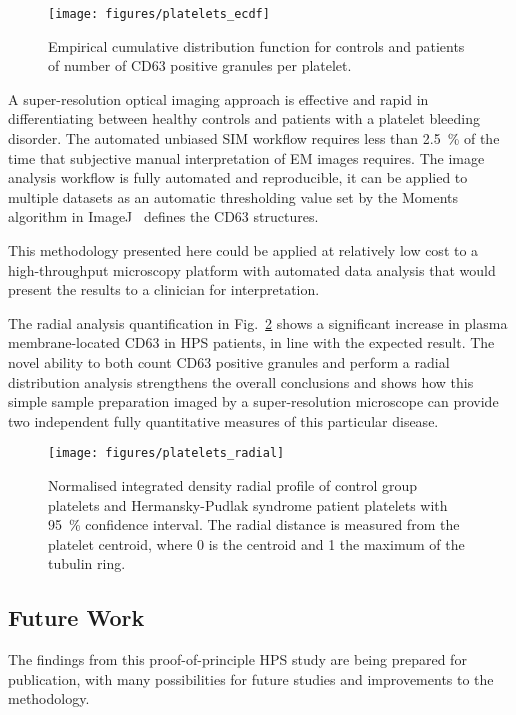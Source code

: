\begin{figure}[htbp]
	\centering
	\texttt{[image: figures/platelets\_ecdf]}
	\caption{\small{Empirical cumulative distribution function for controls and patients of number of CD63 positive granules per platelet.}}
	\label{platelet_ecdf}
\end{figure}

A super-resolution optical imaging approach is effective and rapid in differentiating between healthy controls and patients with a platelet bleeding disorder. The automated unbiased SIM workflow requires less than \SI{2.5}{\percent} of the time that subjective manual interpretation of EM images requires.  The image analysis workflow is fully automated and reproducible, it can be applied to multiple datasets as an automatic thresholding value set by the Moments algorithm in ImageJ~\cite{Schneider2012} defines the CD63 structures.

This methodology presented here could be applied at relatively low cost to a high-throughput microscopy platform with automated data analysis that would present the results to a clinician for interpretation.

The radial analysis quantification in Fig.~\ref{platelets_radial} shows a significant increase in plasma membrane-located CD63 in HPS patients, in line with the expected result. The novel ability to both count CD63 positive granules and perform a radial distribution analysis strengthens the overall conclusions and shows how this simple sample preparation imaged by a super-resolution microscope can provide two independent fully quantitative measures of this particular disease.

\begin{figure}[htbp]
	\centering
	\texttt{[image: figures/platelets\_radial]}
	\caption{\small{Normalised integrated density radial profile of control group platelets and Hermansky-Pudlak syndrome patient platelets with \SI{95}{\percent} confidence interval. The radial distance is measured from the platelet centroid, where 0 is the centroid and 1 the maximum of the tubulin ring.}}
	\label{platelets_radial}
\end{figure}

\subsection{Future Work}
The findings from this proof-of-principle HPS study are being prepared for publication, with many possibilities for future studies and improvements to the methodology.


